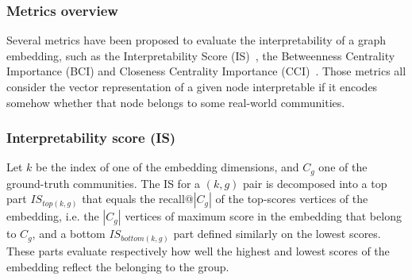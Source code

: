 \subsubsection{Metrics overview}\label{sec:metrics}
Several metrics have been proposed to evaluate the interpretability of a graph embedding, such as the Interpretability Score (IS)~\cite{gogoglou_2019}, the Betweenness Centrality Importance (BCI) and Closeness Centrality Importance (CCI)~\cite{khoshraftar2021}. Those metrics all consider the vector representation of a given node interpretable if it encodes somehow whether that node belongs to some real-world communities. 



\subsubsection{Interpretability score (IS)}
Let $k$ be the index of one of the embedding dimensions, and $C_g$ one of the ground-truth communities. The IS for a $(k, g)$ pair is decomposed into a top part $IS_{top(k, g)}$ 
that equals the recall@$|C_g|$ of the top-scores vertices of the embedding, i.e. the $|C_g|$ vertices of maximum score in the embedding that belong to $C_g$, and a bottom $IS_{bottom(k, g)}$ part defined similarly on the lowest scores.
These parts evaluate respectively how well the highest and lowest scores of the embedding reflect the belonging to the group.

